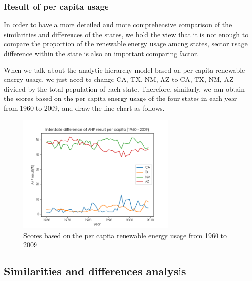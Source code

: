 \documentclass[a4paper,11pt]{article}
\begin{document}
\subsubsection{Result of per capita usage}
\par In order to have a more detailed and more comprehensive comparison of the similarities and differences of the states, we hold the view that it is not enough to compare the proportion of the renewable energy usage among states, sector usage difference within the state is also an important comparing factor.
\par When we talk about the analytic hierarchy model based on per capita renewable energy usage, we just need to change CA, TX, NM, AZ to CA, TX, NM, AZ divided by the total population of each state. Therefore, similarly, we can obtain the scores based on the per capita energy usage of the four states in each year from 1960 to 2009, and draw the line chart as follows.
\begin{figure}[H] 
    \centering 
    \includegraphics[width=0.7\textwidth]{./Pic/B-level-percapita.png}
    \caption{Scores based on the per capita renewable energy usage from 1960 to 2009}
    \label{fig:B-level-percapita}
\end{figure}

\subsection{Similarities and differences analysis}
\end{document}
